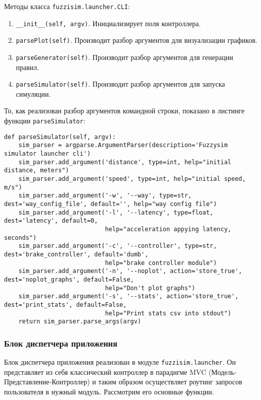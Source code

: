 Методы класса \lstinline!fuzzisim.launcher.CLI!:
\begin{enumerate}[label=\arabic*)]
	\item  \lstinline!__init__(self, argv)!. Инициализирует поля контроллера.
	\item  \lstinline!parsePlot(self)!.  Производит разбор аргументов для визуализации графиков.
	\item  \lstinline!parseGenerator(self)!.  Производит разбор аргументов для генерации правил.
	\item  \lstinline!parseSimulator(self)!.  Производит разбор аргументов для запуска симуляции.
\end{enumerate}

То, как реализован разбор аргументов командной строки, показано в листинге функции \lstinline!parseSimulator!:

\begin{lstlisting}[style=pythonstyle,caption={ }, label=lst:func:1]
def parseSimulator(self, argv):
	sim_parser = argparse.ArgumentParser(description='Fuzzysim simulator launcher cli')
	sim_parser.add_argument('distance', type=int, help="initial distance, meters")
	sim_parser.add_argument('speed', type=int, help="initial speed, m/s")
	sim_parser.add_argument('-w', '--way', type=str, dest='way_config_file', default='', help="way config file")
	sim_parser.add_argument('-l', '--latency', type=float, dest='latency', default=0,
							help="acceleration appying latency, seconds")
	sim_parser.add_argument('-c', '--controller', type=str, dest='brake_controller', default='dumb',
							help="brake controller module")
	sim_parser.add_argument('-n', '--noplot', action='store_true', dest='noplot_graphs', default=False,
							help="Don't plot graphs")
	sim_parser.add_argument('-s', '--stats', action='store_true', dest='print_stats', default=False,
							help="Print stats csv into stdout")
	return sim_parser.parse_args(argv)
\end{lstlisting}



\subsubsection{Блок диспетчера приложения }


Блок диспетчера приложения реализован в модуле \lstinline!fuzzisim.launcher!. Он представляет из себя классический контроллер в парадигме MVC (Модель-Представление-Контроллер) и таким образом осуществляет роутинг запросов пользователя в нужный модуль. Рассмотрим его основные функции.

